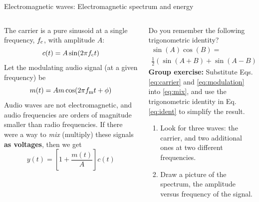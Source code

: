 \documentclass{beamer}
\begin{document}
\begin{frame}{Electromagnetic waves: Electromagnetic spectrum and energy}
\footnotesize
\begin{columns}[T]
\begin{column}{0.5\textwidth}
The carrier is a pure sinusoid at a single frequency, $f_{\rm c}$, with amplitude $A$:
\begin{equation}
c(t) = A\sin(2\pi f_{\rm c} t) \label{eq:carrier}
\end{equation}
Let the modulating audio signal (at a given frequency) be
\begin{equation}
m(t) = Am\cos(2\pi f_{\rm m} t + \phi) \label{eq:modulation}
\end{equation}
Audio waves are not electromagnetic, and audio frequencies are orders of magnitude smaller than radio frequencies.  If there were a way to \textit{mix} (multiply) these signals \textbf{\alert{as voltages}}, then we get
\begin{equation}
y(t) = \left[1+\frac{m(t)}{A}\right]c(t) \label{eq:mix}
\end{equation}
\end{column}
\begin{column}{0.5\textwidth}
Do you remember the following trigonometric identity?
\begin{multline}
\sin(A)\cos(B) = \\ \frac{1}{2}\left(\sin(A+B) + \sin(A-B)\right) \label{eq:ident}
\end{multline}
\textbf{Group exercise:}
Substitute Eqs. \ref{eq:carrier} and \ref{eq:modulation} into \ref{eq:mix}, and use the trigonometric identity in Eq. \ref{eq:ident} to simplify the result.
\begin{enumerate}
\item Look for three waves: the carrier, and two additional ones at two different frequencies.
\item Draw a picture of the spectrum, the amplitude versus frequency of the signal.
\end{enumerate}
\end{column}
\end{columns}
\end{frame}
\end{document}
